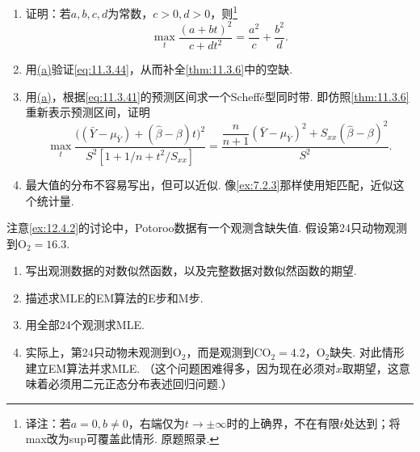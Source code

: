 \begin{exercise}\label{exercise:11.40}\leavevmode
\begin{enumerate}[label=(\alph*)]
\item\label{item:11.40.a} 证明：若$a,b,c,d$为常数，$c>0,d>0$，则\footnote{译注：若$a=0,b\ne0$，右端仅为$t\to\pm\infty$时的上确界，不在有限$t$处达到；将max改为sup可覆盖此情形. 原题照录.}
$$\max_t\frac{(a+bt)^2}{c+dt^2}=\frac{a^2}c+\frac{b^2}d.$$
\item\label{item:11.40.b} 用\hyperref[item:11.40.a]{(a)}验证\eqref{eq:11.3.44}，从而补全\autoref{thm:11.3.6}中的空缺.
\item\label{item:11.40.c} 用\hyperref[item:11.40.a]{(a)}，根据\eqref{eq:11.3.41}的预测区间求一个Scheff\'e型同时带. 即仿照\autoref{thm:11.3.6}重新表示预测区间，证明
$$\max_t\frac{\bigl((\bar Y-\mu_{\bar Y})+(\hat\beta-\beta)t\bigr)^2}{S^2[1+1/n+t^2/S_{xx}]}
=\frac{\dfrac n{n+1}(\bar Y-\mu_{\bar Y})^2+S_{xx}(\hat\beta-\beta)^2}{S^2}.$$
\item\label{item:11.40.d} 最大值的分布不容易写出，但可以近似. 像\autoref{ex:7.2.3}那样使用矩匹配，近似这个统计量.
\end{enumerate}
\end{exercise}

\begin{exercise}\label{exercise:11.41}
注意\autoref{ex:12.4.2}的讨论中，Potoroo数据有一个观测含缺失值. 假设第24只动物观测到$\mathrm O_2=16.3$.
\begin{enumerate}[label=(\alph*)]
\item\label{item:11.41.a} 写出观测数据的对数似然函数，以及完整数据对数似然函数的期望.
\item\label{item:11.41.b} 描述求MLE的EM算法的E步和M步.
\item\label{item:11.41.c} 用全部24个观测求MLE.
\item\label{item:11.41.d} 实际上，第24只动物未观测到$\mathrm O_2$，而是观测到$\mathrm{CO}_2=4.2$，$\mathrm O_2$缺失. 对此情形建立EM算法并求MLE. （这个问题困难得多，因为现在必须对$x$取期望，这意味着必须用二元正态分布表述回归问题.）
\end{enumerate}
\end{exercise}
